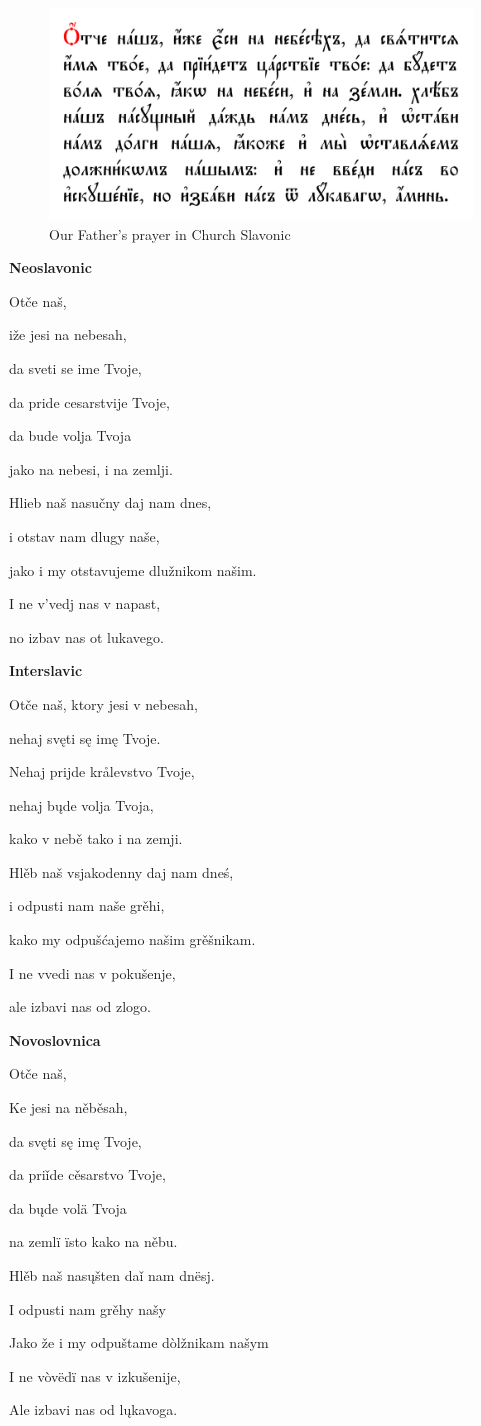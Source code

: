 \begin{figure}
	\includegraphics[width=\linewidth]{./sources/of-church-slav.png}
	\caption{Our Father's prayer in Church Slavonic}
	\label{fig:of-church-slav}
\end{figure}

\textbf{Neoslavonic}

Otče naš,

iže jesi na nebesah,

da sveti se ime Tvoje,

da pride cesarstvije Tvoje,

da bude volja Tvoja

jako na nebesi, i na zemlji.

Hlieb naš nasučny daj nam dnes,

i otstav nam dlugy naše,

jako i my otstavujeme dlužnikom našim.

I ne v'vedj nas v napast,

no izbav nas ot lukavego. 

\textbf{Interslavic}

Otče naš, ktory jesi v nebesah,

nehaj svęti sę imę Tvoje.

Nehaj prijde krålevstvo Tvoje,

nehaj bųde volja Tvoja,

kako v nebě tako i na zemji.

Hlěb naš vsjakodenny daj nam dneś,

i odpusti nam naše grěhi,

kako my odpušćajemo našim grěšnikam.

I ne vvedi nas v pokušenje,

ale izbavi nas od zlogo.

\textbf{Novoslovnica}

Otče naš,

Ke jesi na něběsah,

da svęti sę imę Tvoje,

da priǐde cěsarstvo Tvoje,

da bųde volä Tvoja

na zemlï ïsto kako na něbu.

Hlěb naš nasųšten daǐ nam dnësj.

I odpusti nam grěhy našy

Jako že i my odpuštame dòlžnikam našym

I ne vòvëdï nas v izkušenije,

Ale izbavi nas od lųkavoga.

